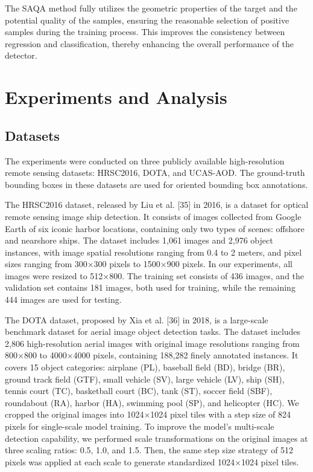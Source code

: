 \documentclass[10pt,twocolumn,final]{article}
\begin{document}
The SAQA method fully utilizes the geometric properties of the target and the potential quality of the samples, ensuring the reasonable selection of positive samples during the training process. This improves the consistency between regression and classification, thereby enhancing the overall performance of the detector.

\section{ Experiments and Analysis }

\subsection{ Datasets }

The experiments were conducted on three publicly available high-resolution remote sensing datasets: HRSC2016, DOTA, and UCAS-AOD. The ground-truth bounding boxes in these datasets are used for oriented bounding box annotations.

The HRSC2016 dataset, released by Liu et al. [35] in 2016, is a dataset for optical remote sensing image ship detection. It consists of images collected from Google Earth of six iconic harbor locations, containing only two types of scenes: offshore and nearshore ships. The dataset includes 1,061 images and 2,976 object instances, with image spatial resolutions ranging from 0.4 to 2 meters, and pixel sizes ranging from 300×300 pixels to 1500×900 pixels. In our experiments, all images were resized to 512×800. The training set consists of 436 images, and the validation set contains 181 images, both used for training, while the remaining 444 images are used for testing.

The DOTA dataset, proposed by Xia et al. [36] in 2018, is a large-scale benchmark dataset for aerial image object detection tasks. The dataset includes 2,806 high-resolution aerial images with original image resolutions ranging from 800×800 to 4000×4000 pixels, containing 188,282 finely annotated instances. It covers 15 object categories: airplane (PL), baseball field (BD), bridge (BR), ground track field (GTF), small vehicle (SV), large vehicle (LV), ship (SH), tennis court (TC), basketball court (BC), tank (ST), soccer field (SBF), roundabout (RA), harbor (HA), swimming pool (SP), and helicopter (HC). We cropped the original images into 1024×1024 pixel tiles with a step size of 824 pixels for single-scale model training. To improve the model's multi-scale detection capability, we performed scale transformations on the original images at three scaling ratios: 0.5, 1.0, and 1.5. Then, the same step size strategy of 512 pixels was applied at each scale to generate standardized 1024×1024 pixel tiles.
\end{document}
